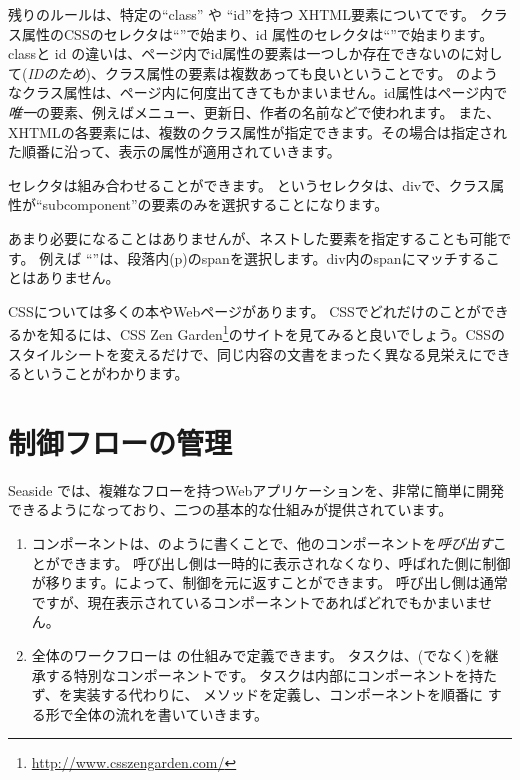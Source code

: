 \documentclass[a4paper,10pt,twoside]{book}
\begin{document}
残りのルールは、特定の``class'' や ``id''を持つ XHTML要素についてです。
クラス属性のCSSのセレクタは``''で始まり、id 属性のセレクタは``\ct{#}''で始まります。
classと id の違いは、ページ内でid属性の要素は一つしか存在できないのに対して(\emph{IDのため})、クラス属性の要素は複数あっても良いということです。
のようなクラス属性は、ページ内に何度出てきてもかまいません。id属性はページ内で \emph{唯一}の要素、例えばメニュー、更新日、作者の名前などで使われます。
また、XHTMLの各要素には、複数のクラス属性が指定できます。その場合は指定された順番に沿って、表示の属性が適用されていきます。


セレクタは組み合わせることができます。  というセレクタは、divで、クラス属性が``subcomponent''の要素のみを選択することになります。

あまり必要になることはありませんが、ネストした要素を指定することも可能です。
例えば ``''は、段落内(p)のspanを選択します。div内のspanにマッチすることはありません。

CSSについては多くの本やWebページがあります。
CSSでどれだけのことができるかを知るには、CSS Zen Garden\footnote{\url{http://www.csszengarden.com/}}のサイトを見てみると良いでしょう。CSSのスタイルシートを変えるだけで、同じ内容の文書をまったく異なる見栄えにできるということがわかります。

\section{制御フローの管理}

Seaside では、複雑なフローを持つWebアプリケーションを、非常に簡単に開発できるようになっており、二つの基本的な仕組みが提供されています。

\begin{enumerate}
  \item コンポーネントは、のように書くことで、他のコンポーネントを\emph{呼び出す}ことができます。
    呼び出し側は一時的に表示されなくなり、呼ばれた側に制御が移ります。によって、制御を元に返すことができます。
    呼び出し側は通常 ですが、現在表示されているコンポーネントであればどれでもかまいません。

  \item 全体のワークフローは の仕組みで定義できます。
    タスクは、(でなく)を継承する特別なコンポーネントです。
    タスクは内部にコンポーネントを持たず、を実装する代わりに、 メソッドを定義し、コンポーネントを順番に する形で全体の流れを書いていきます。
\end{enumerate}
\end{document}

